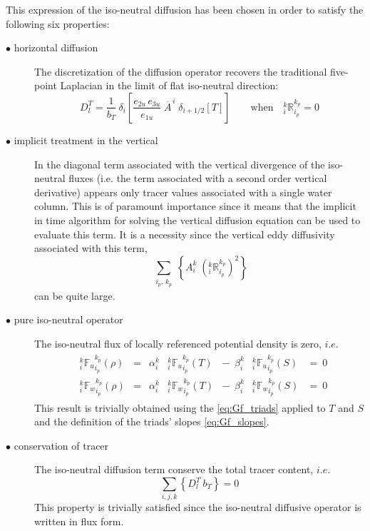 \documentclass[../tex_main/NEMO_manual]{subfiles}
\begin{document}
This expression of the iso-neutral diffusion has been chosen in order to satisfy the following six properties:
\begin{description}
\item[$\bullet$ horizontal diffusion]
  The discretization of the diffusion operator recovers the traditional five-point Laplacian in
  the limit of flat iso-neutral direction:
\begin{equation} \label{eq:Gf_property1a}
D_l^T = \frac{1}{b_T}  \ \delta_{i} 
	\left[ \frac{e_{2u}\,e_{3u}}{e_{1u}} \; \overline{A}^{\,i} \; \delta_{i+1/2}[T] \right] 
\qquad  \text{when} \quad 
	{ _i^k \mathbb{R}_{i_p}^{k_p} }=0
\end{equation}

\item[$\bullet$ implicit treatment in the vertical]
  In the diagonal term associated with the vertical divergence of the iso-neutral fluxes
  (i.e. the term associated with a second order vertical derivative)
  appears only tracer values associated with a single water column.
  This is of paramount importance since it means that
  the implicit in time algorithm for solving the vertical diffusion equation can be used to evaluate this term.
  It is a necessity since the vertical eddy diffusivity associated with this term,  
\begin{equation}
	 \sum_{\substack{i_p, \,k_p}} \left\{  
		A_i^k \; \left(_i^k \mathbb{R}_{i_p}^{k_p}\right)^2
	\right\} 
\end{equation}
can be quite large.

\item[$\bullet$ pure iso-neutral operator]
  The iso-neutral flux of locally referenced potential density is zero, $i.e.$
\begin{align} \label{eq:Gf_property2}
\begin{matrix}
&{_i^k {\mathbb{F}_u}_{i_p}^{k_p} (\rho)} 
	&=    &\alpha_i^k   &{_i^k {\mathbb{F}_u}_{i_p}^{k_p} } (T) 
	&- \ \;  \beta _i^k    &{_i^k {\mathbb{F}_u}_{i_p}^{k_p} } (S) & = \ 0   \\
&{_i^k {\mathbb{F}_w}_{i_p}^{k_p} (\rho)} 
	&=    &\alpha_i^k   &{_i^k {\mathbb{F}_w}_{i_p}^{k_p} } (T) 
	&- \  \; \beta _i^k    &{_i^k {\mathbb{F}_w}_{i_p}^{k_p} } (S)  &= \ 0
\end{matrix}
\end{align}
This result is trivially obtained using the \autoref{eq:Gf_triads} applied to $T$ and $S$ and
the definition of the triads' slopes \autoref{eq:Gf_slopes}.

\item[$\bullet$ conservation of tracer]
  The iso-neutral diffusion term conserve the total tracer content, $i.e.$
\begin{equation} \label{eq:Gf_property1}
\sum_{i,j,k} \left\{ D_l^T \ b_T \right\} = 0
\end{equation}
This property is trivially satisfied since the iso-neutral diffusive operator is written in flux form.


\end{description}
\end{document}

